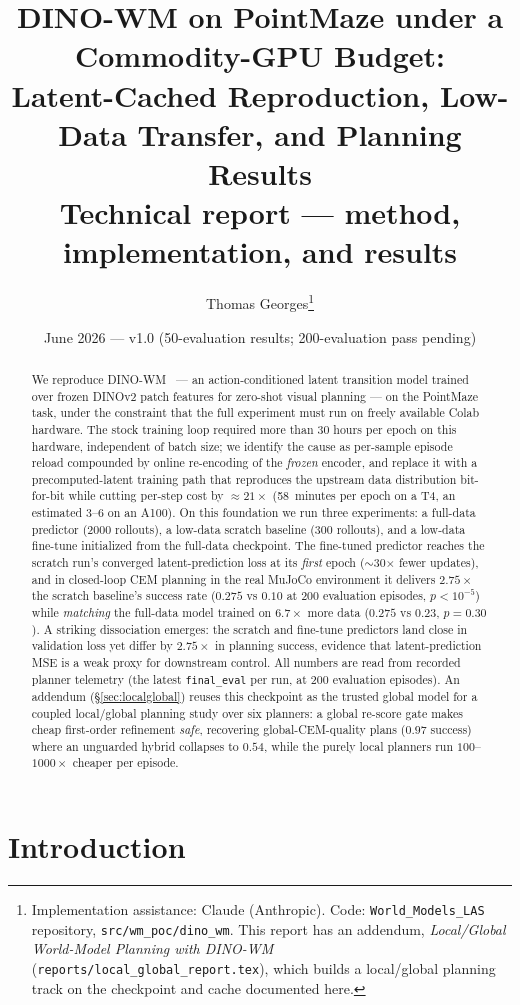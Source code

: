\documentclass[11pt,a4paper]{article}
\title{DINO-WM on PointMaze under a Commodity-GPU Budget:\\
Latent-Cached Reproduction, Low-Data Transfer, and Planning Results\\
{\large Technical report --- method, implementation, and results}}
\author{Thomas Georges\thanks{Implementation assistance: Claude (Anthropic). Code:
\texttt{World\_Models\_LAS} repository, \texttt{src/wm\_poc/dino\_wm}. This report has
an addendum, \emph{Local/Global World-Model Planning with DINO-WM}
(\texttt{reports/local\_global\_report.tex}), which builds a local/global
planning track on the checkpoint and cache documented here.}}
\date{June 2026 --- v1.0 (50-evaluation results; 200-evaluation pass pending)}
\begin{document}
\maketitle

\begin{abstract}
We reproduce DINO-WM~\cite{dinowm2025} --- an action-conditioned latent
transition model trained over frozen DINOv2 patch features for zero-shot
visual planning --- on the PointMaze task, under the constraint that the full
experiment must run on freely available Colab hardware. The stock training
loop required more than 30 hours per epoch on this hardware, independent of
batch size; we identify the cause as per-sample episode reload compounded by
online re-encoding of the \emph{frozen} encoder, and replace it with a
precomputed-latent training path that reproduces the upstream data
distribution bit-for-bit while cutting per-step cost by ${\approx}21\times$
(58~minutes per epoch on a T4, an estimated 3--6 on an A100). On this
foundation we run three experiments: a full-data predictor (2000 rollouts), a
low-data scratch baseline (300 rollouts), and a low-data fine-tune initialized
from the full-data checkpoint. The fine-tuned predictor reaches the scratch
run's converged latent-prediction loss at its \emph{first} epoch
($\sim$30$\times$ fewer updates), and in closed-loop CEM planning in the real
MuJoCo environment it delivers $2.75\times$ the scratch baseline's success rate
($0.275$ vs $0.10$ at 200 evaluation episodes, $p<10^{-5}$) while
\emph{matching} the full-data model trained on $6.7\times$ more data ($0.275$
vs $0.23$, $p{=}0.30$). A striking dissociation emerges: the scratch and
fine-tune predictors land close in validation loss yet differ by $2.75\times$
in planning success, evidence that latent-prediction MSE is a weak proxy for
downstream control. All numbers are read from recorded planner telemetry (the
latest \texttt{final\_eval} per run, at 200 evaluation episodes). An addendum
(\S\ref{sec:localglobal}) reuses this checkpoint as the trusted global model for
a coupled local/global planning study over six planners: a global re-score gate
makes cheap first-order refinement \emph{safe}, recovering global-CEM-quality
plans ($0.97$ success) where an unguarded hybrid collapses to $0.54$, while the
purely local planners run $100$--$1000\times$ cheaper per episode.
\end{abstract}

\section{Introduction}
\label{sec:intro}
\end{document}
